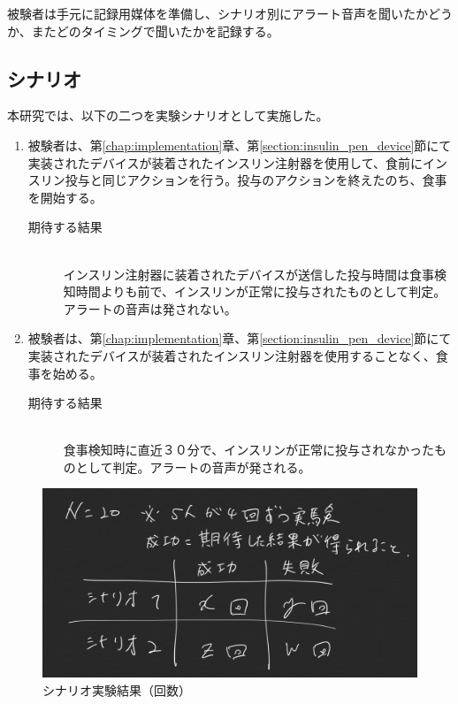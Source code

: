 被験者は手元に記録用媒体を準備し、シナリオ別にアラート音声を聞いたかどうか、またどのタイミングで聞いたかを記録する。

\subsection{シナリオ}

本研究では、以下の二つを実験シナリオとして実施した。

\begin{enumerate}
  \item 被験者は、第\ref{chap:implementation}章、第\ref{section:insulin_pen_device}節にて実装されたデバイスが装着されたインスリン注射器を使用して、食前にインスリン投与と同じアクションを行う。投与のアクションを終えたのち、食事を開始する。
  \begin{description}
    \item[期待する結果]\mbox{}\\
      インスリン注射器に装着されたデバイスが送信した投与時間は食事検知時間よりも前で、インスリンが正常に投与されたものとして判定。アラートの音声は発されない。
  \end{description}
  \item 被験者は、第\ref{chap:implementation}章、第\ref{section:insulin_pen_device}節にて実装されたデバイスが装着されたインスリン注射器を使用することなく、食事を始める。
  \begin{description}
    \item[期待する結果]\mbox{}\\
      食事検知時に直近３０分で、インスリンが正常に投与されなかったものとして判定。アラートの音声が発される。
  \end{description}
\end{enumerate}

\begin{figure}[htbp]
  \caption{シナリオ実験結果（回数）}
  \label{fig:notify_success_failure}
  \begin{center}
    \includegraphics[bb=0 0 1000 400,width=20cm]{assets/notify_success_failure.png}
  \end{center}
\end{figure}

